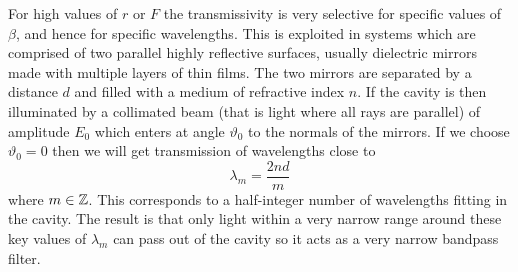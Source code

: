     For high values of \(r\) or \(F\) the transmissivity is very selective for specific values of \(\beta\), and hence for specific wavelengths.
    This is exploited in  systems which are comprised of two parallel highly reflective surfaces, usually dielectric mirrors made with multiple layers of thin films.
    The two mirrors are separated by a distance \(d\) and filled with a medium of refractive index \(n\).
    If the cavity is then illuminated by a collimated beam (that is light where all rays are parallel) of amplitude \(E_0\) which enters at angle \(\vartheta_0\) to the normals of the mirrors.
    If we choose \(\vartheta_0 = 0\) then we will get transmission of wavelengths close to
    \[\lambda_m = \frac{2nd}{m}\]
    where \(m\in\mathbb{Z}\).
    This corresponds to a half-integer number of wavelengths fitting in the cavity.
    The result is that only light within a very narrow range around these key values of \(\lambda_m\) can pass out of the cavity so it acts as a very narrow bandpass filter.